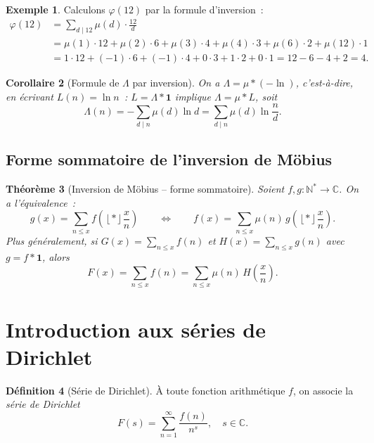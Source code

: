 \documentclass[12pt,a4paper,openany]{book}
\theoremstyle{definition}
\newtheorem{definition}{Définition}[chapter]
\newtheorem{exemple}[definition]{Exemple}
\theoremstyle{plain}
\newtheorem{theoreme}[definition]{Théorème}
\newtheorem{corollaire}[definition]{Corollaire}
\theoremstyle{remark}
\newcommand{\N}{\mathbb{N}}
\newcommand{\C}{\mathbb{C}}
\newcommand{\floor}[1]{\left\lfloor #1 \right\rfloor}
\begin{document}
\begin{exemple}
\label{ex:phi-par-inversion}
Calculons $\varphi(12)$ par la formule d'inversion~:
\begin{align*}
  \varphi(12) &= \sum_{d \mid 12} \mu(d) \cdot \frac{12}{d} \\
    &= \mu(1) \cdot 12 + \mu(2) \cdot 6 + \mu(3) \cdot 4 + \mu(4) \cdot 3
      + \mu(6) \cdot 2 + \mu(12) \cdot 1 \\
    &= 1 \cdot 12 + (-1) \cdot 6 + (-1) \cdot 4 + 0 \cdot 3 + 1 \cdot 2 + 0 \cdot 1
     = 12 - 6 - 4 + 2 = 4.
\end{align*}
\end{exemple}

\begin{corollaire}[Formule de $\Lambda$ par inversion]
\label{cor:Lambda-par-inversion}
On a $\Lambda = \mu * (-\ln)$, c'est-à-dire, en écrivant $L(n) = \ln n$~:
$L = \Lambda * \mathbf{1}$ implique $\Lambda = \mu * L$, soit
\[
  \Lambda(n) = -\sum_{d \mid n} \mu(d) \ln d = \sum_{d \mid n} \mu(d) \ln\frac{n}{d}.
\]
\end{corollaire}

\subsection{Forme sommatoire de l'inversion de Möbius}

\begin{theoreme}[Inversion de Möbius -- forme sommatoire]
\label{thm:inversion-sommatoire}
Soient $f, g : \N^* \to \C$. On a l'équivalence~:
\[
  g(x) = \sum_{n \leq x} f\!\left(\floor*{\frac{x}{n}}\right)
  \qquad \Longleftrightarrow \qquad
  f(x) = \sum_{n \leq x} \mu(n)\, g\!\left(\floor*{\frac{x}{n}}\right).
\]
Plus généralement, si $G(x) = \sum_{n \leq x} f(n)$ et $H(x) = \sum_{n \leq x} g(n)$
avec $g = f * \mathbf{1}$, alors
\[
  F(x) = \sum_{n \leq x} f(n) = \sum_{n \leq x} \mu(n)\, H\!\left(\frac{x}{n}\right).
\]
\end{theoreme}

\section{Introduction aux séries de Dirichlet}
\label{sec:series-dirichlet}

\begin{definition}[Série de Dirichlet]
\label{def:serie-dirichlet}
À toute fonction arithmétique $f$, on associe la \emph{série de Dirichlet}
\[
  F(s) = \sum_{n=1}^{\infty} \frac{f(n)}{n^s}, \quad s \in \C.
\]
\end{definition}
\end{document}
